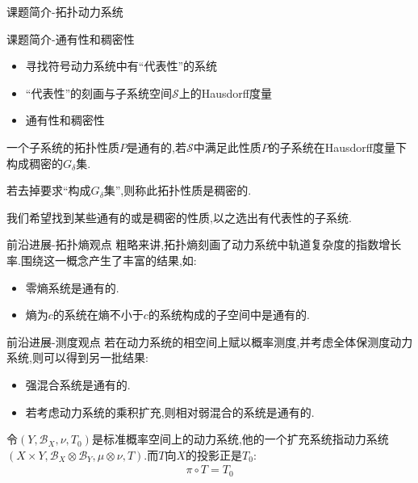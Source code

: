 \documentclass[11pt]{beamer}                                                                                                                 \usetheme{Madrid}
\begin{document}
\begin{CJK}{UTF8}{gbsn}
\begin{frame}{课题简介-拓扑动力系统}
	\end{frame}
	
	\begin{frame}{课题简介-通有性和稠密性}
	
	\begin{itemize}
		\item 寻找符号动力系统中有“代表性”的系统
		\item “代表性”的刻画与子系统空间$\mathcal{S}$上的Hausdorff度量
		\item 通有性和稠密性
	\end{itemize}
	
	\begin{definition}[通有性和稠密性]
		一个子系统的拓扑性质$P$是通有的,若$\mathcal{S}$中满足此性质$P$的子系统在Hausdorff度量下构成稠密的$G_\delta$集.
		
		若去掉要求“构成$G_\delta$集”,则称此拓扑性质是稠密的.
	\end{definition}
	我们希望找到某些通有的或是稠密的性质,以之选出有代表性的子系统.
	\end{frame}
	
	\begin{frame}{前沿进展-拓扑熵观点}
		粗略来讲,拓扑熵刻画了动力系统中轨道复杂度的指数增长率.围绕这一概念产生了丰富的结果,如:
		\begin{itemize}
			\item 零熵系统是通有的.
			\item 熵为$c$的系统在熵不小于$c$的系统构成的子空间中是通有的.
		\end{itemize}
	\end{frame}
	
	\begin{frame}{前沿进展-测度观点}
		若在动力系统的相空间上赋以概率测度,并考虑全体保测度动力系统,则可以得到另一批结果:
		\begin{itemize}
			\item 强混合系统是通有的.
			\item 若考虑动力系统的乘积扩充,则相对弱混合的系统是通有的.
		\end{itemize}
		
		\begin{definition}[动力系统的扩充]
			令$(Y,\mathcal{B}_X,\nu,T_0 )$是标准概率空间上的动力系统,他的一个扩充系统指动力系统$(X\times Y,\mathcal{B}_X\otimes\mathcal{B}_Y,\mu\otimes\nu,T)$.而$T$向$X$的投影正是$T_0$:
			\begin{align*}
				\pi\circ T=T_0
			\end{align*}
		\end{definition}
		

\end{frame}
\end{CJK}
\end{document}
